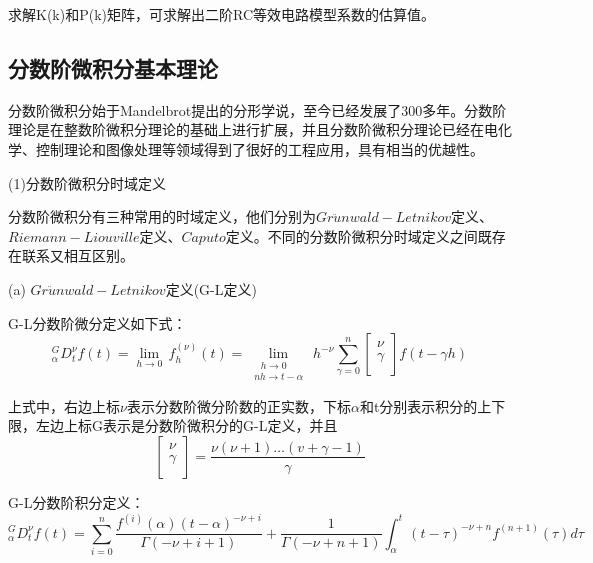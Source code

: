  求解K(k)和P(k)矩阵，可求解出二阶RC等效电路模型系数的估算值。

\subsection{分数阶微积分基本理论}
分数阶微积分始于Mandelbrot提出的分形学说，至今已经发展了300多年。分数阶理论是在整数阶微积分理论的基础上进行扩展，并且分数阶微积分理论已经在电化学、控制理论和图像处理等领域得到了很好的工程应用，具有相当的优越性。

(1)分数阶微积分时域定义

分数阶微积分有三种常用的时域定义，他们分别为$Gr\ddot{u}nwald-Letnikov$定义、$Riemann-Liouville$定义、$Caputo$定义。不同的分数阶微积分时域定义之间既存在联系又相互区别。

(a) $Gr\ddot{u}nwald-Letnikov$定义(G-L定义)

G-L分数阶微分定义如下式：
\begin{equation}
{}_{\alpha }^{G}D_{t}^{\nu }f(t)=\underset{h\to 0}{\mathop{\lim }}\,f_{h}^{(\nu )}\left( t \right)=\underset{\begin{smallmatrix} 
 ~~~h\to 0 \\ 
 nh\to t-\alpha  
\end{smallmatrix}}{\mathop{\lim }}\,{{h}^{-\nu }}\sum\limits_{\gamma =0}^{n}{\left[ \begin{matrix}
   \nu   \\
   \gamma   \\
\end{matrix} \right]}f\left( t-\gamma h \right)
\end{equation}

上式中，右边上标$\nu $表示分数阶微分阶数的正实数，下标$\alpha $和t分别表示积分的上下限，左边上标G表示是分数阶微积分的G-L定义，并且
\begin{equation}
\left[ \begin{matrix}
   \nu   \\
   \gamma   \\
\end{matrix} \right]=\frac{\nu \left( \nu +1 \right)\ldots \left( v+\gamma -1 \right)}{\gamma }
\end{equation}

G-L分数阶积分定义：
\begin{equation}
{}_{\alpha }^{G}D_{t}^{\nu }f(t)=\sum\limits_{i=0}^{n}{\frac{{{f}^{\left( i \right)}}\left( \alpha  \right){{\left( t-\alpha  \right)}^{-\nu +i}}}{\Gamma \left( -\nu +i+1 \right)}+\frac{1}{\Gamma \left( -\nu +n+1 \right)}}\int_{\alpha }^{t}{{{\left( t-\tau  \right)}^{-\nu +n}}{{f}^{\left( n+1 \right)}}\left( \tau  \right)}d\tau 
\end{equation}

